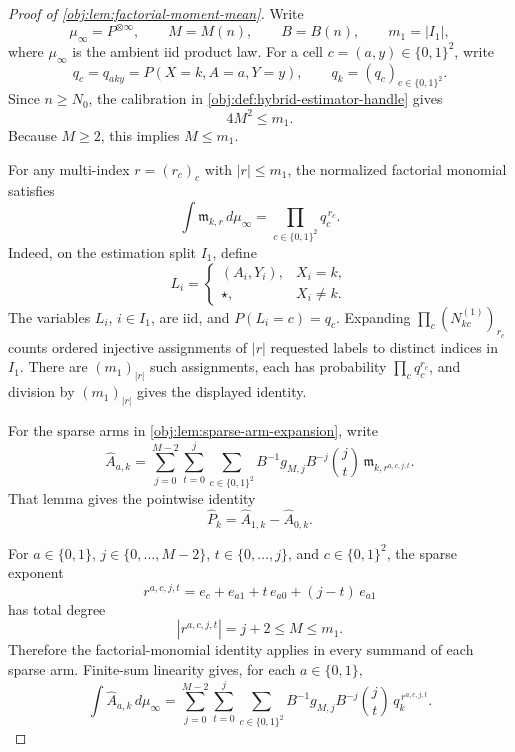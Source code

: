 \documentclass[11pt]{article}
\begin{document}
\begin{proof}[Proof of \cref{obj:lem:factorial-moment-mean}]
Write
\[
\mu_\infty=P^{\otimes\infty},\qquad
M=M(n),\qquad B=B(n),\qquad m_1=|I_1|,
\]
where \(\mu_\infty\) is the ambient iid product law.  For a cell
\(c=(a,y)\in\{0,1\}^2\), write
\[
q_c=q_{aky}=P(X=k,A=a,Y=y),
\qquad
q_k=(q_c)_{c\in\{0,1\}^2}.
\]
Since \(n\ge N_0\), the calibration in \cref{obj:def:hybrid-estimator-handle} gives
\[
4M^2\le m_1 .
\]
Because \(M\ge2\), this implies \(M\le m_1\).

For any multi-index \(r=(r_c)_c\) with \(|r|\le m_1\), the normalized factorial monomial satisfies
\[
\int
\mathfrak m_{k,r}\,d\mu_\infty
=
\prod_{c\in\{0,1\}^2} q_c^{\,r_c}.
\]
Indeed, on the estimation split \(I_1\), define
\[
L_i=
\begin{cases}
(A_i,Y_i),& X_i=k,\\
\star,& X_i\ne k .
\end{cases}
\]
The variables \(L_i\), \(i\in I_1\), are iid, and \(P(L_i=c)=q_c\).  Expanding
\(\prod_c (N^{(1)}_{kc})_{r_c}\) counts ordered injective assignments of \(|r|\) requested labels to distinct indices in \(I_1\).  There are \((m_1)_{|r|}\) such assignments, each has probability \(\prod_c q_c^{r_c}\), and division by \((m_1)_{|r|}\) gives the displayed identity.

For the sparse arms in \cref{obj:lem:sparse-arm-expansion}, write
\[
\widehat A_{a,k}
=
\sum_{j=0}^{M-2}\sum_{t=0}^{j}\sum_{c\in\{0,1\}^2}
B^{-1}g_{M,j}B^{-j}\binom jt\,
\mathfrak m_{k,r^{a,c,j,t}} .
\]
That lemma gives the pointwise identity
\[
\widehat P_k=\widehat A_{1,k}-\widehat A_{0,k}.
\]

For \(a\in\{0,1\}\), \(j\in\{0,\ldots,M-2\}\), \(t\in\{0,\ldots,j\}\), and \(c\in\{0,1\}^2\), the sparse exponent
\[
r^{a,c,j,t}
=
e_c+e_{a1}+t\,e_{a0}+(j-t)\,e_{a1}
\]
has total degree
\[
|r^{a,c,j,t}|=j+2\le M\le m_1 .
\]
Therefore the factorial-monomial identity applies in every summand of each sparse arm.  Finite-sum linearity gives, for each \(a\in\{0,1\}\),
\[
\int \widehat A_{a,k}\,d\mu_\infty
=
\sum_{j=0}^{M-2}\sum_{t=0}^{j}\sum_{c\in\{0,1\}^2}
B^{-1}g_{M,j}B^{-j}\binom jt\,
q_k^{\,r^{a,c,j,t}} .
\]


\end{proof}
\end{document}
